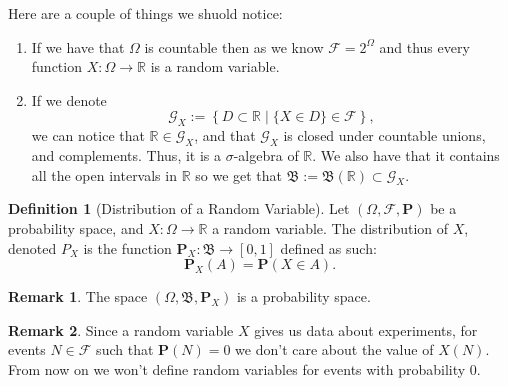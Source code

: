 \documentclass[11pt,a4paper]{article}
\theoremstyle{definition}
\newtheorem{definition}{Definition}[section]
\newtheorem{remark}{Remark}[section]
\theoremstyle{plain}
\newcommand{\R}{\mathbb{R}}
\newcommand{\set}[2]{ \left\{ #1 \mid #2 \right\} }
\begin{document}
  Here are a couple of things we shuold notice:
  \begin{enumerate}
    \item If we have that $\Omega$ is countable then as we know 
    $\mathcal F = 2^\Omega$ and thus every function $X \colon \Omega \to \R$
    is a random variable.
    \item If we denote 
    \[
      \mathcal G_X := \set{D \subset \R}{\{X \in D\} \in \mathcal F},
    \]
    we can notice that $\R \in \mathcal G_X$, and that $\mathcal G_X$ is
    closed under countable unions, and complements. 
    Thus, it is a $\sigma$-algebra of $\R$.
    We also have that it contains all the open intervals in $\R$ so we
    get that $\mathfrak B := \mathfrak B(\R) \subset \mathcal G_X$.
  \end{enumerate}
  
  \begin{definition}[Distribution of a Random Variable]
    Let $(\Omega, \mathcal F, \mathbf P)$ be a probability space, and 
    $X \colon \Omega \to \R$ a random variable.
    The distribution of $X$, denoted $P_X$ is the function 
    $\mathbf P_X \colon \mathfrak B \to [0,1]$ defined as such:
    \[
      \mathbf P_X(A) = \mathbf P(X \in A).
    \]
  \end{definition}
  \begin{remark}
    The space $(\Omega, \mathfrak B, \mathbf P_X)$ is a probability space.
  \end{remark}
  \begin{remark}
    Since a random variable $X$ gives us data about experiments, for events
    $N \in \mathcal F$ such that $\mathbf P(N) = 0$ we don't care about the
    value of $X(N)$. From now on we won't define random variables for events
    with probability $0$.
  \end{remark}
  
\end{document}
